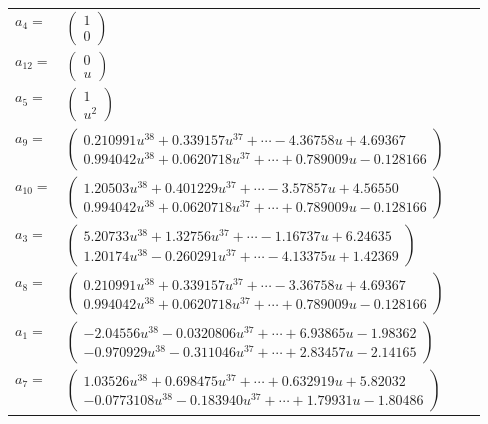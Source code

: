 \documentclass[1p]{elsarticle_modified}
\theoremstyle{definition}
\begin{document}
\begin{tabular}{m{7pt} m{180pt} m{7pt} m{180pt} }
\flushright $a_{4}=$&$\begin{pmatrix}1\\0\end{pmatrix}$ \\
\flushright $a_{12}=$&$\begin{pmatrix}0\\u\end{pmatrix}$ \\
\flushright $a_{5}=$&$\begin{pmatrix}1\\u^2\end{pmatrix}$ \\
\flushright $a_{9}=$&$\begin{pmatrix}0.210991 u^{38}+0.339157 u^{37}+\cdots-4.36758 u+4.69367\\0.994042 u^{38}+0.0620718 u^{37}+\cdots+0.789009 u-0.128166\end{pmatrix}$ \\
\flushright $a_{10}=$&$\begin{pmatrix}1.20503 u^{38}+0.401229 u^{37}+\cdots-3.57857 u+4.56550\\0.994042 u^{38}+0.0620718 u^{37}+\cdots+0.789009 u-0.128166\end{pmatrix}$ \\
\flushright $a_{3}=$&$\begin{pmatrix}5.20733 u^{38}+1.32756 u^{37}+\cdots-1.16737 u+6.24635\\1.20174 u^{38}-0.260291 u^{37}+\cdots-4.13375 u+1.42369\end{pmatrix}$ \\
\flushright $a_{8}=$&$\begin{pmatrix}0.210991 u^{38}+0.339157 u^{37}+\cdots-3.36758 u+4.69367\\0.994042 u^{38}+0.0620718 u^{37}+\cdots+0.789009 u-0.128166\end{pmatrix}$ \\
\flushright $a_{1}=$&$\begin{pmatrix}-2.04556 u^{38}-0.0320806 u^{37}+\cdots+6.93865 u-1.98362\\-0.970929 u^{38}-0.311046 u^{37}+\cdots+2.83457 u-2.14165\end{pmatrix}$ \\
\flushright $a_{7}=$&$\begin{pmatrix}1.03526 u^{38}+0.698475 u^{37}+\cdots+0.632919 u+5.82032\\-0.0773108 u^{38}-0.183940 u^{37}+\cdots+1.79931 u-1.80486\end{pmatrix}$ \\

\end{tabular}
\end{document}
